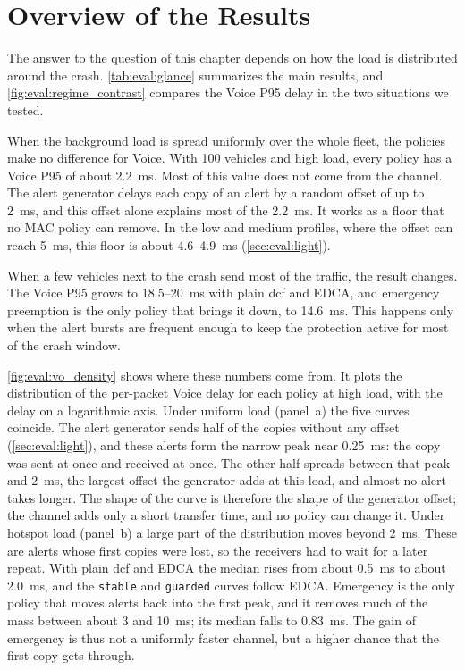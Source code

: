 \section{Overview of the Results}
\label{sec:eval:headline}

The answer to the question of this chapter depends on how the load is distributed around the crash.
\autoref{tab:eval:glance} summarizes the main results, and \autoref{fig:eval:regime_contrast} compares the Voice P95 delay in the two situations we tested.

When the background load is spread uniformly over the whole fleet, the policies make no difference for Voice.
With 100 vehicles and high load, every policy has a Voice P95 of about 2.2~ms.
Most of this value does not come from the channel.
The alert generator delays each copy of an alert by a random offset of up to \SI{2}{\milli\second}, and this offset alone explains most of the 2.2~ms.
It works as a floor that no MAC policy can remove.
In the low and medium profiles, where the offset can reach \SI{5}{\milli\second}, this floor is about 4.6--4.9~ms (\autoref{sec:eval:light}).

When a few vehicles next to the crash send most of the traffic, the result changes.
The Voice P95 grows to 18.5--20~ms with plain \gls{dcf} and EDCA, and emergency preemption is the only policy that brings it down, to 14.6~ms.
This happens only when the alert bursts are frequent enough to keep the protection active for most of the crash window.

\autoref{fig:eval:vo_density} shows where these numbers come from.
It plots the distribution of the per-packet Voice delay for each policy at high load, with the delay on a logarithmic axis.
Under uniform load (panel~a) the five curves coincide.
The alert generator sends half of the copies without any offset (\autoref{sec:eval:light}), and these alerts form the narrow peak near 0.25~ms: the copy was sent at once and received at once.
The other half spreads between that peak and 2~ms, the largest offset the generator adds at this load, and almost no alert takes longer.
The shape of the curve is therefore the shape of the generator offset; the channel adds only a short transfer time, and no policy can change it.
Under hotspot load (panel~b) a large part of the distribution moves beyond 2~ms.
These are alerts whose first copies were lost, so the receivers had to wait for a later repeat.
With plain \gls{dcf} and EDCA the median rises from about 0.5~ms to about 2.0~ms, and the \texttt{stable} and \texttt{guarded} curves follow EDCA.
Emergency is the only policy that moves alerts back into the first peak, and it removes much of the mass between about 3 and 10~ms; its median falls to 0.83~ms.
The gain of emergency is thus not a uniformly faster channel, but a higher chance that the first copy gets through.

